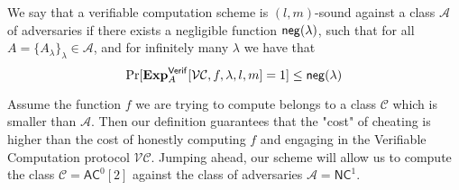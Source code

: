 

\begin{definition}[Soundness]
\label{def:vc-soundness}
We say that a verifiable computation scheme is $(l,m)$-sound against a class 
$\mathcal{A}$ of adversaries if there exists a negligible function $\mathsf{neg}(\lambda)$, such that for all $A = \{A_\lambda\}_\lambda \in \mathcal{A}$, and for infinitely many $\lambda$ we have that 
\[
\Pr[{\bf Exp}^{\mathsf{Verif}}_{A}[{\cal VC}, f, \lambda, l,m]=1] \leq \mathsf{neg}(\lambda)
\]
\end{definition}

Assume the function $f$ 
we are trying to compute belongs to a class $\mathcal{C}$ which is smaller than 
$\mathcal{A}$. Then our definition guarantees that the "cost" of cheating is higher than the cost of honestly computing $f$ and engaging in the Verifiable Computation protocol $\mathcal{VC}$. Jumping ahead, our scheme will allow us to compute the class $\mathcal{C}=\mathsf{AC}^0[2]$ against the class of 
adversaries $\mathcal{A}=\mathsf{NC}^1$.

